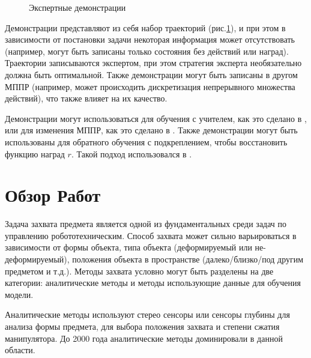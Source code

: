 \documentclass{mipt-thesis-bs}
\begin{document}
\begin{figure}[ht]
    \centering
    \vspace{-0.2cm}
    \caption{Экспертные демонстрации}
    \label{demo}
\end{figure}

Демонстрации представляют из себя набор траекторий (рис.\ref{demo}), и при этом в зависимости от постановки задачи некоторая информация может отсутствовать (например, могут быть записаны только состояния без действий или наград). Траектории записываются экспертом, при этом стратегия эксперта необязательно должна быть оптимальной. Также демонстрации могут быть записаны в другом МППР (например, может происходить дискретизация непрерывного множества действий), что также влияет на их качество.

Демонстрации могут использоваться для обучения с учителем, как это сделано в \cite{dqfd}, или для изменения МППР, как это сделано в \cite{pofd}. Также демонстрации могут быть использованы для обратного обучения с подкреплением, чтобы восстановить функцию наград $r$. Такой подход использовался в \cite{gail}.   

\chapter{Обзор Работ}

Задача захвата предмета является одной из фундаментальных среди задач по управлению робототехническим. Способ захвата может сильно варьироваться в зависимости от формы объекта, типа объекта (деформируемый или не-деформируемый), положения объекта в пространстве (далеко/близко/под другим предметом и т.д.). Методы захвата условно могут быть разделены на две категории: аналитические методы и методы использующие данные для обучения модели. 

Аналитические методы используют стерео сенсоры или сенсоры глубины для анализа формы предмета, для выбора положения захвата и степени сжатия манипулятора. До 2000 года аналитические методы доминировали в данной области.
\end{document}
